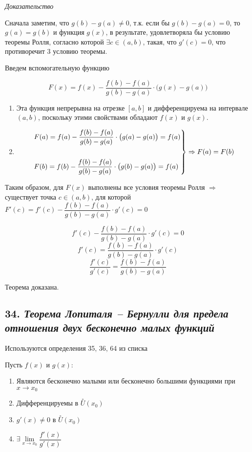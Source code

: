\textit{Доказательство}

Сначала заметим, что $g(b) - g(a) \neq 0$, т.к. если бы $g(b) - g(a) = 0$, то $g(a) = g(b)$ и функция $g(x)$, в результате, удовлетворяла бы условию теоремы Ролля, согласно которой $\exists c \in (a, b)$, такая, что $g'(c) = 0$, что противоречит 3 условию теоремы.

Введем вспомогательную функцию

$$
F(x) = f(x) - \dfrac{f(b) - f(a)}{g(b)-g(a)}\cdot \big(g(x) - g(a)\big)
$$
\begin{enumerate}

\item Эта функция непрерывна на отрезке $[a, b]$ и дифференцируема на интервале $(a, b)$, поскольку этими свойствами обладают $f(x)$ и $g(x)$.
\item $$\begin{rcases}
        F(a) = f(a) - {\dfrac{f(b) - f(a)}{g(b)-g(a)}}\cdot \big(g(a) - g(a)\big) = f(a)\\\\
        F(b) = f(b) - {\dfrac{f(b) - f(a)}{g(b)-g(a)}}\cdot \big(g(b) - g(a)\big) = f(a)
    \end{rcases}
    \Rightarrow F(a) = F(b)
    $$

\end{enumerate}

Таким образом, для $F(x)$ выполнены все условия теоремы Ролля $\Rightarrow$ существует точка $c \in (a, b)$, для которой $F'(c) = f'(c) - {\dfrac{f(b) - f(a)}{g(b)-g(a)}}\cdot g'(c) = 0$

$$f'(c) - {\dfrac{f(b) - f(a)}{g(b)-g(a)}}\cdot g'(c) = 0$$ $$f'(c) = {\dfrac{f(b) - f(a)}{g(b)-g(a)}}\cdot g'(c)$$ $$\dfrac{f'(c)}{g'(c)}=\dfrac{f(b) - f(a)}{g(b)-g(a)}$$

Теорема доказана.
\newpage 
\subsection*{34. \textit{Теорема Лопиталя – Бернулли для предела отношения двух бесконечно малых функций}}
\begin{Quote2} 
\small\centering 

Используются определения 35, 36, 64 из списка \end{Quote2} 

Пусть $f(x)$ и $g(x)$:
\begin{enumerate}

\item Являются бесконечно малыми или бесконечно большими функциями при $x \rightarrow x_0$
\item Дифференцируемы в $\overset{\circ}U(x_0)$
\item $g'(x) \neq 0$ в $\overset{\circ}U(x_0)$
\item $\exists \lim\limits_{x \rightarrow x_0}{\dfrac{f'(x)}{g'(x)}}$

\end{enumerate}

